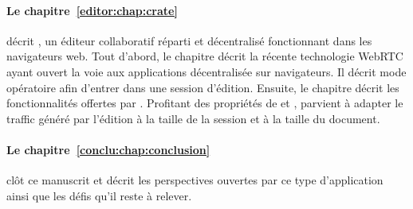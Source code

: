 \paragraph{Le chapitre~\ref{editor:chap:crate}} décrit \CRATE, un éditeur
collaboratif réparti et décentralisé fonctionnant dans les navigateurs web.
Tout d'abord, le chapitre décrit la récente technologie WebRTC ayant ouvert la
voie aux applications décentralisée sur navigateurs. Il décrit mode opératoire
afin d'entrer dans une session d'édition. Ensuite, le chapitre décrit les
fonctionnalités offertes par \CRATE.  Profitant des propriétés de \SPRAY et
\LSEQ, \CRATE parvient à adapter le traffic généré par l'édition à la taille de
la session et à la taille du document.

\paragraph{Le chapitre~\ref{conclu:chap:conclusion}} clôt ce manuscrit et décrit
les perspectives ouvertes par ce type d'application ainsi que les défis qu'il
reste à relever.


